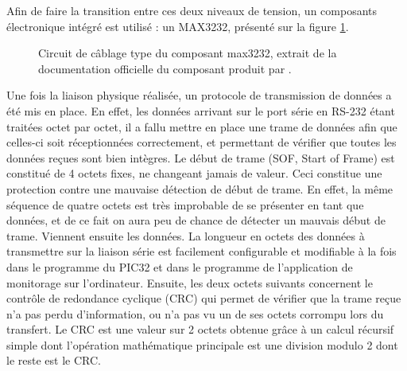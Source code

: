 \documentclass[letterpaper, twoside, 12pt, memoire, creativecommons, hyperref]{thETS}
\begin{document}
Afin de faire la transition entre ces deux niveaux de tension, un composants électronique intégré est utilisé : un MAX3232, présenté sur la figure \ref{fig:max3232}.

\begin{figure}
	\centering
	\caption{Circuit de câblage type du composant max3232, extrait de la documentation officielle du composant produit par \cite{MAXIM3232}.}
	\label{fig:max3232}
\end{figure}

Une fois la liaison physique réalisée, un protocole de transmission de données a été mis en place. En effet, les données arrivant sur le port série en RS-232 étant traitées octet par octet, il a fallu mettre en place une trame de données afin que celles-ci soit réceptionnées correctement, et permettant de vérifier que toutes les données reçues sont bien intègres.
Le début de trame (SOF, Start of Frame) est constitué de 4 octets fixes, ne changeant jamais de valeur. Ceci constitue une protection contre une mauvaise détection de début de trame. En effet, la même séquence de quatre octets est très improbable de se présenter en tant que données, et de ce fait on aura peu de chance de détecter un mauvais début de trame. Viennent ensuite les données. La longueur en octets des données à transmettre sur la liaison série est facilement configurable et modifiable à la fois dans le programme du PIC32 et dans le programme de l'application de monitorage sur l'ordinateur.
Ensuite, les deux octets suivants concernent le contrôle de redondance cyclique (CRC) qui permet de vérifier que la trame reçue n'a pas perdu d'information, ou n'a pas vu un de ses octets corrompu lors du transfert. Le CRC est une valeur sur 2 octets obtenue grâce à un calcul récursif simple dont l'opération mathématique principale est une division modulo 2 dont le reste est le CRC. %
\end{document}
